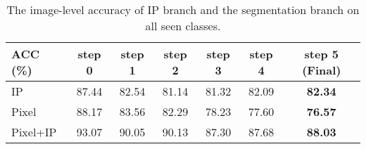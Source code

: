 \begin{table}[h]
    \centering
    \caption{The image-level accuracy of IP branch and the segmentation branch on all seen classes.}
    \begin{tabular}{l|c c c c c c}
         \toprule
         ACC (\%) & step 0 & step 1  & step 2 & step 3 & step 4 & \textbf{step 5 (Final)} \\
         \midrule
         IP & 87.44 & 82.54 & 81.14 & 81.32 & 82.09 & \textbf{82.34} \\
         Pixel & 88.17 & 83.56 & 82.29 & 78.23 & 77.60 & \textbf{76.57} \\
         Pixel+IP & 93.07 & 90.05 & 90.13 & 87.30 & 87.68 & \textbf{88.03} \\
         \bottomrule
    \end{tabular}
    \label{tab:IP_all_acc}
\end{table}



